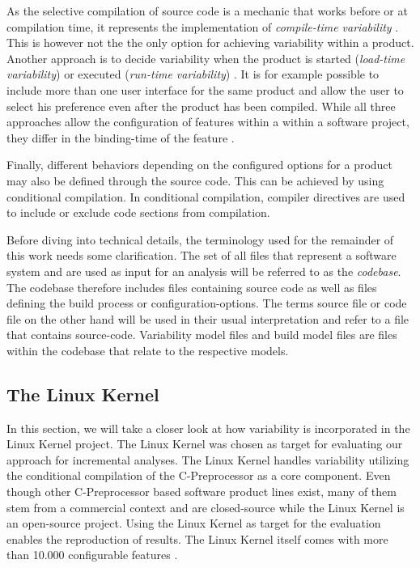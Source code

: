 \documentclass[a4paper]{article}
\begin{document}
As the selective compilation of source code is a mechanic that works before or at compilation time, it represents the implementation of \emph{compile-time variability} \cite[p.49]{Apel:2013:FSP:2541773}. This is however not the the only option for achieving variability within a product. Another approach is to decide variability when the product is started (\emph{load-time variability}) or executed (\emph{run-time variability}) \cite[p.49]{Apel:2013:FSP:2541773}. It is for example possible to include more than one user interface for the same product and allow the user to select his preference even after the product has been compiled. While all three approaches allow the configuration of features within a within a software project, they differ in the binding-time of the feature \cite[p.48f]{Apel:2013:FSP:2541773}. 

Finally, different behaviors depending on the configured options for a product may also be defined through the source code. This can be achieved by using conditional compilation. In conditional compilation, compiler directives are used to include or exclude code sections from compilation. 

Before diving into technical details, the terminology used for the remainder of this work needs some clarification. The set of all files  that represent a software system and are used as input for an analysis will be referred to as the \emph{codebase}. The codebase therefore includes files containing source code as well as files defining the build process or configuration-options. The terms source file or code file on the other hand will be used in their usual interpretation and refer to a file that contains source-code. Variability model files and build model files are files within the codebase that relate to the respective models. 

\subsection{The Linux Kernel}\label{linux-kernel}

In this section, we will take a closer look at how variability is incorporated in the Linux Kernel project. The Linux Kernel was chosen as target for evaluating our approach for incremental analyses. The Linux Kernel handles variability utilizing the conditional compilation of the C-Preprocessor as a core component.  Even though other C-Preprocessor based software product lines exist, many of them stem from a commercial context and are closed-source while the Linux Kernel is an open-source project. Using the Linux Kernel as target for the evaluation enables the reproduction of results. The Linux Kernel itself comes with more than 10.000 configurable features \cite{Tartler:2011:FCC:1966445.1966451}. 
\end{document}
